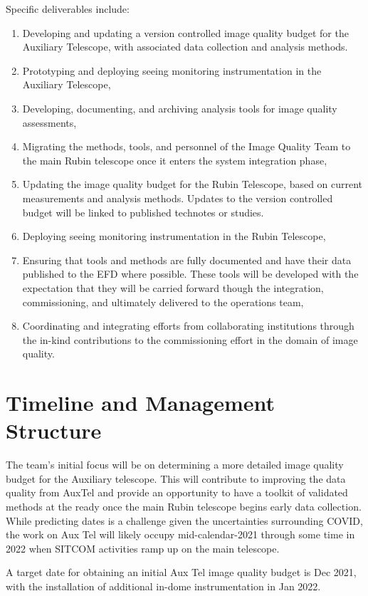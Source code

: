 \documentclass[SE,authoryear,toc]{lsstdoc}
\begin{document}
Specific deliverables include:
\begin{enumerate}
\item Developing and updating a version controlled image quality budget for the Auxiliary Telescope, with associated data collection and analysis methods.
\item Prototyping and deploying seeing monitoring instrumentation in the Auxiliary Telescope,
\item Developing, documenting, and archiving analysis tools for image quality assessments,
\item Migrating the methods, tools, and personnel of the Image Quality Team to the main Rubin telescope once it enters the system integration phase,
\item Updating the image quality budget for the Rubin Telescope, based on current measurements and analysis methods.
    Updates to the version controlled budget will be linked to published technotes or studies.
\item Deploying seeing monitoring instrumentation in the Rubin Telescope,
\item Ensuring that tools and methods are fully documented and have their data published to the EFD where possible.
    These tools will be developed with the expectation that they will be carried forward though the integration, commissioning, and ultimately delivered to the operations team,
\item Coordinating and integrating efforts from collaborating institutions through the in-kind contributions to the commissioning effort in the domain of image quality.
\end{enumerate}

\section{Timeline and Management Structure}

The team's initial focus will be on determining a more detailed image quality budget for the Auxiliary telescope.
This will contribute to improving the data quality from AuxTel and provide an opportunity to have a toolkit of validated methods at the ready once the main Rubin telescope begins early data collection.
While predicting dates is a challenge given the uncertainties surrounding COVID, the work on Aux Tel will likely occupy mid-calendar-2021 through some time in 2022 when SITCOM activities ramp up on the main telescope.

A target date for obtaining an initial Aux Tel image quality budget is Dec 2021, with the installation of additional in-dome instrumentation in Jan 2022.
\end{document}
